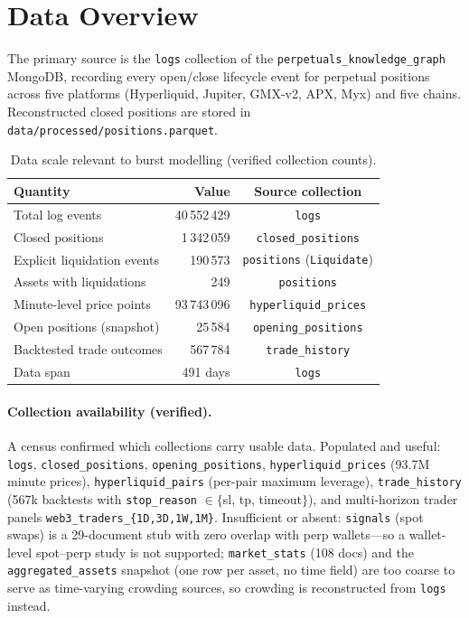 \documentclass[11pt,a4paper]{article}
\begin{document}
\section{Data Overview}

The primary source is the \texttt{logs} collection of the \texttt{perpetuals\_knowledge\_graph} MongoDB, recording every open/close lifecycle event for perpetual positions across five platforms (Hyperliquid, Jupiter, GMX-v2, APX, Myx) and five chains. Reconstructed closed positions are stored in \texttt{data/processed/positions.parquet}.

\begin{table}[ht]
\centering
\caption{Data scale relevant to burst modelling (verified collection counts).}
\label{tab:scale}
\begin{tabular}{lrc}
\toprule
Quantity & Value & Source collection \\
\midrule
Total log events            & 40\,552\,429 & \texttt{logs} \\
Closed positions            & 1\,342\,059  & \texttt{closed\_positions} \\
Explicit liquidation events & 190\,573     & \texttt{positions} (\texttt{Liquidate}) \\
Assets with liquidations    & 249          & \texttt{positions} \\
Minute-level price points    & 93\,743\,096 & \texttt{hyperliquid\_prices} \\
Open positions (snapshot)   & 25\,584      & \texttt{opening\_positions} \\
Backtested trade outcomes   & 567\,784     & \texttt{trade\_history} \\
Data span                   & 491 days     & \texttt{logs} \\
\bottomrule
\end{tabular}
\end{table}

\paragraph{Collection availability (verified).} A census confirmed which collections carry usable data. Populated and useful: \texttt{logs}, \texttt{closed\_positions}, \texttt{opening\_positions}, \texttt{hyperliquid\_prices} (93.7M minute prices), \texttt{hyperliquid\_pairs} (per-pair maximum leverage), \texttt{trade\_history} (567k backtests with \texttt{stop\_reason} $\in\{$sl, tp, timeout$\}$), and multi-horizon trader panels \texttt{web3\_traders\_\{1D,3D,1W,1M\}}. Insufficient or absent: \texttt{signals} (spot swaps) is a 29-document stub with zero overlap with perp wallets---so a wallet-level spot--perp study is not supported; \texttt{market\_stats} (108 docs) and the \texttt{aggregated\_assets} snapshot (one row per asset, no time field) are too coarse to serve as time-varying crowding sources, so crowding is reconstructed from \texttt{logs} instead.
\end{document}
